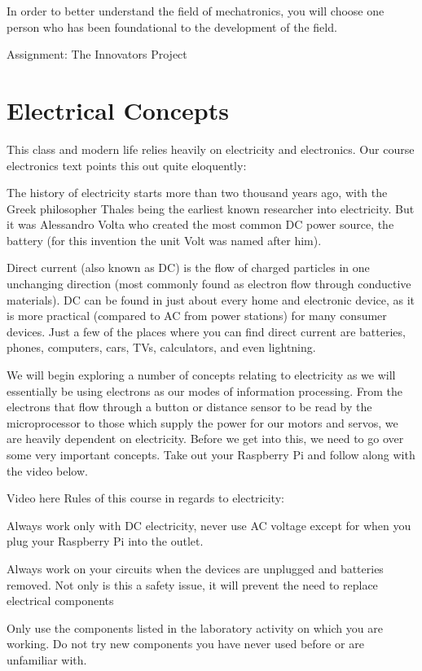 \documentclass[
]{book}
\begin{document}
In order to better understand the field of mechatronics, you will choose one person who has been foundational to the development of the field.

Assignment: The Innovators Project

\hypertarget{electrical-concepts}{%
\chapter{Electrical Concepts}\label{electrical-concepts}}

This class and modern life relies heavily on electricity and electronics. Our course electronics text points this out quite eloquently:

The history of electricity starts more than two thousand years ago, with the Greek philosopher Thales being the earliest known researcher into electricity. But it was Alessandro Volta who created the most common DC power source, the battery (for this invention the unit Volt was named after him).

Direct current (also known as DC) is the flow of charged particles in one unchanging direction (most commonly found as electron flow through conductive materials). DC can be found in just about every home and electronic device, as it is more practical (compared to AC from power stations) for many consumer devices. Just a few of the places where you can find direct current are batteries, phones, computers, cars, TVs, calculators, and even lightning.

We will begin exploring a number of concepts relating to electricity as we will essentially be using electrons as our modes of information processing. From the electrons that flow through a button or distance sensor to be read by the microprocessor to those which supply the power for our motors and servos, we are heavily dependent on electricity. Before we get into this, we need to go over some very important concepts. Take out your Raspberry Pi and follow along with the video below.

Video here
Rules of this course in regards to electricity:

Always work only with DC electricity, never use AC voltage except for when you plug your Raspberry Pi into the outlet.

Always work on your circuits when the devices are unplugged and batteries removed. Not only is this a safety issue, it will prevent the need to replace electrical components

Only use the components listed in the laboratory activity on which you are working. Do not try new components you have never used before or are unfamiliar with.
\end{document}
